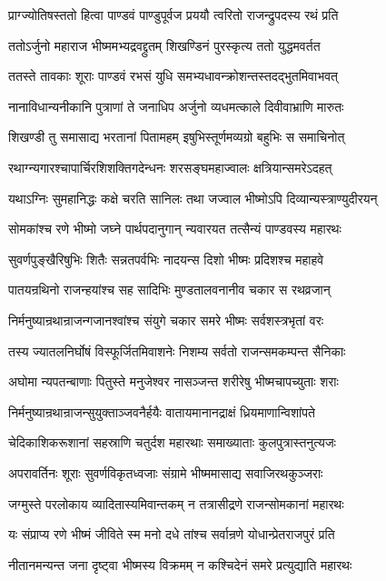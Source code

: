 \twolineshloka
{प्राग्ज्योतिषस्ततो हित्वा पाण्डवं पाण्डुपूर्वज}
{प्रययौ त्वरितो राजन्द्रुपदस्य रथं प्रति}


\threelineshloka
{ततोऽर्जुनो महाराज भीष्ममभ्यद्रवद्द्रुतम्}
{शिखण्डिनं पुरस्कृत्य ततो युद्धमवर्तत}
{}


\twolineshloka
{ततस्ते तावकाः शूराः पाण्डवं रभसं युधि}
{समभ्यधावन्क्रोशन्तस्तदद्भुतमिवाभवत्}


\twolineshloka
{नानाविधान्यनीकानि पुत्राणां ते जनाधिप}
{अर्जुनो व्यधमत्काले दिवीवाभ्राणि मारुतः}


\twolineshloka
{शिखण्डी तु समासाद्य भरतानां पितामहम्}
{इषुभिस्तूर्णमव्यग्रो बहुभिः स समाचिनोत्}


\twolineshloka
{रथाग्न्यगारश्चापार्चिरशिशक्तिगदेन्धनः}
{शरसङ्घमहाज्वालः क्षत्रियान्समरेऽदहत्}


\twolineshloka
{यथाऽग्निः सुमहानिद्धः कक्षे चरति सानिलः}
{तथा जज्वाल भीष्मोऽपि दिव्यान्यस्त्राण्युदीरयन्}


\twolineshloka
{सोमकांश्च रणे भीष्मो जघ्ने पार्थपदानुगान्}
{न्यवारयत तत्सैन्यं पाण्डवस्य महारथः}


\twolineshloka
{सुवर्णपुङ्खैरिषुभिः शितैः सन्नतपर्वभिः}
{नादयन्स दिशो भीष्मः प्रदिशश्च महाहवे}


\twolineshloka
{पातयन्रथिनो राजन्हयांश्च सह सादिभिः}
{मुण्डतालवनानीव चकार स रथव्रजान्}


\twolineshloka
{निर्मनुष्यान्रथान्राजन्गजानश्वांश्च संयुगे}
{चकार समरे भीष्मः सर्वशस्त्रभृतां वरः}


\twolineshloka
{तस्य ज्यातलनिर्घोषं विस्फूर्जितमिवाशनेः}
{निशम्य सर्वतो राजन्समकम्पन्त सैनिकाः}


\twolineshloka
{अघोमा न्यपतन्बाणाः पितुस्ते मनुजेश्वर}
{नासञ्जन्त शरीरेषु भीष्मचापच्युताः शराः}


\twolineshloka
{निर्मनुष्यान्रथान्राजन्सुयुक्ताञ्जवनैर्हयैः}
{वातायमानानद्राक्षं ध्रियमाणान्विशांपते}


\twolineshloka
{चेदिकाशिकरूशानां सहस्राणि चतुर्दश}
{महारथाः समाख्याताः कुलपुत्रास्तनुत्यजः}


\twolineshloka
{अपरावर्तिनः शूराः सुवर्णविकृतध्वजाः}
{संग्रामे भीष्ममासाद्य सवाजिरथकुञ्जराः}


\twolineshloka
{जग्मुस्ते परलोकाय व्यादितास्यमिवान्तकम्}
{न तत्रासीद्रणे राजन्सोमकानां महारथः}


\twolineshloka
{यः संप्राप्य रणे भीष्मं जीविते स्म मनो दधे}
{तांश्च सर्वान्रणे योधान्प्रेतराजपुरं प्रति}


\twolineshloka
{नीतानमन्यन्त जना दृष्ट्वा भीष्मस्य विक्रमम्}
{न कश्चिदेनं समरे प्रत्युद्याति महारथः}


